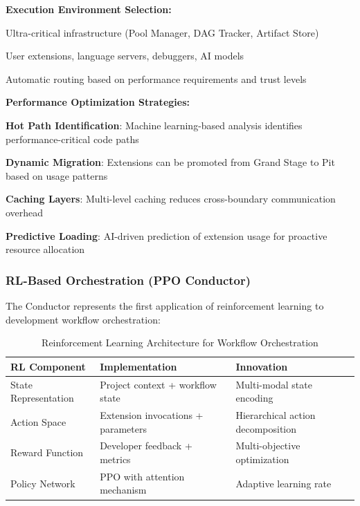 \begin{successbox}
\begin{alertbox}
\textbf{Execution Environment Selection:}

\begin{description}[leftmargin=4cm,labelwidth=3.5cm]
    \item[\textbf{The Pit}] Ultra-critical infrastructure (Pool Manager, DAG Tracker, Artifact Store)
    \item[\textbf{The Grand Stage}] User extensions, language servers, debuggers, AI models
    \item[\textbf{Hybrid Workflows}] Automatic routing based on performance requirements and trust levels
\end{description}

\textbf{Performance Optimization Strategies:}

\begin{expandedlist}
    \item \textbf{Hot Path Identification}: Machine learning-based analysis identifies performance-critical code paths
    
    \item \textbf{Dynamic Migration}: Extensions can be promoted from Grand Stage to Pit based on usage patterns
    
    \item \textbf{Caching Layers}: Multi-level caching reduces cross-boundary communication overhead
    
    \item \textbf{Predictive Loading}: AI-driven prediction of extension usage for proactive resource allocation
\end{expandedlist}

\subsubsection{RL-Based Orchestration (PPO Conductor)}

The Conductor represents the first application of reinforcement learning to development workflow orchestration:

\begin{table}[ht]
\centering
\begin{tabular}{@{}lll@{}}
\toprule
\textbf{RL Component} & \textbf{Implementation} & \textbf{Innovation} \\
\midrule
State Representation & Project context + workflow state & Multi-modal state encoding \\
Action Space & Extension invocations + parameters & Hierarchical action decomposition \\
Reward Function & Developer feedback + metrics & Multi-objective optimization \\
Policy Network & PPO with attention mechanism & Adaptive learning rate \\
\bottomrule
\end{tabular}
\caption{Reinforcement Learning Architecture for Workflow Orchestration}
\label{tab:rl-architecture}
\end{table}


\end{alertbox}
\end{successbox}
